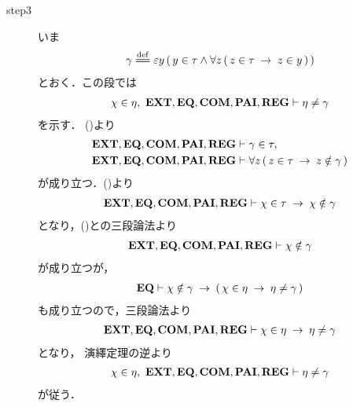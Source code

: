 \begin{sketch}
\begin{description}
			\item[step3] いま
				\begin{align}
					\gamma \defeq \varepsilon y\, (\, y \in \tau \wedge \forall z\, (\, z \in \tau \rarrow z \in y\, )\, )
				\end{align}
				とおく．この段では
				\begin{align}
					\chi \in \eta,\ \mbox{{\bf EXT}},\mbox{{\bf EQ}},\mbox{\bf COM},\mbox{{\bf PAI}},\mbox{{\bf REG}} \vdash 
					\eta \neq \gamma
				\end{align}
				を示す．
				()より
				\begin{align}
					\mbox{{\bf EXT}},\mbox{{\bf EQ}},\mbox{\bf COM},\mbox{{\bf PAI}},\mbox{{\bf REG}} &\vdash \gamma \in \tau, 
					\label{fom:no_pair_of_sets_go_round_4} \\
					\mbox{{\bf EXT}},\mbox{{\bf EQ}},\mbox{\bf COM},\mbox{{\bf PAI}},\mbox{{\bf REG}} &\vdash \forall z\, (\, z \in \tau \hspace{0.25em}\rightarrow\hspace{0.25em} z \notin \gamma\, )
					\label{fom:no_pair_of_sets_go_round_5}
				\end{align}
				が成り立つ．()より
				\begin{align}
					\mbox{{\bf EXT}},\mbox{{\bf EQ}},\mbox{\bf COM},\mbox{{\bf PAI}},\mbox{{\bf REG}} \vdash 
					\chi \in \tau \hspace{0.25em}\rightarrow\hspace{0.25em} \chi \notin \gamma
				\end{align}
				となり，()との三段論法より
				\begin{align}
					\mbox{{\bf EXT}},\mbox{{\bf EQ}},\mbox{\bf COM},\mbox{{\bf PAI}},\mbox{{\bf REG}} \vdash \chi \notin \gamma
					\label{fom:no_pair_of_sets_go_round_8}
				\end{align}
				が成り立つが，
				\begin{align}
					\mbox{{\bf EQ}} \vdash \chi \notin \gamma \hspace{0.25em}\rightarrow\hspace{0.25em} 
					(\,\chi \in \eta  \hspace{0.25em}\rightarrow\hspace{0.25em} \eta \neq \gamma\, )
				\end{align}
				も成り立つので，三段論法より
				\begin{align}
					\mbox{{\bf EXT}},\mbox{{\bf EQ}},\mbox{\bf COM},\mbox{{\bf PAI}},\mbox{{\bf REG}} \vdash 
					\chi \in \eta  \hspace{0.25em}\rightarrow\hspace{0.25em} \eta \neq \gamma
				\end{align}
				となり，%
				演繹定理の逆より
				\begin{align}
					\chi \in \eta,\ \mbox{{\bf EXT}},\mbox{{\bf EQ}},\mbox{\bf COM},\mbox{{\bf PAI}},\mbox{{\bf REG}} \vdash 
					\eta \neq \gamma
					\label{fom:no_pair_of_sets_go_round_7}
				\end{align}
				が従う．
				

\end{description}
\end{sketch}
